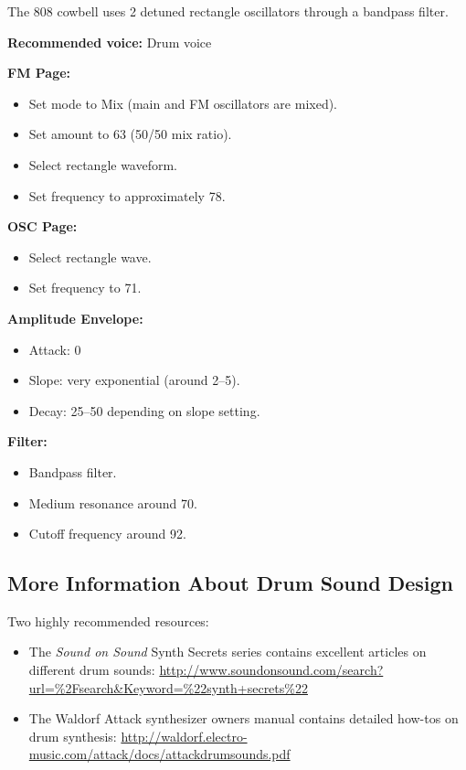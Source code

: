 The 808 cowbell uses 2 detuned rectangle oscillators through a bandpass
filter.

\textbf{Recommended voice:} Drum voice

\textbf{FM Page:}

\begin{itemize}
\tightlist
\item
  Set mode to Mix (main and FM oscillators are mixed).
\item
  Set amount to 63 (50/50 mix ratio).
\item
  Select rectangle waveform.
\item
  Set frequency to approximately 78.
\end{itemize}

\textbf{OSC Page:}

\begin{itemize}
\tightlist
\item
  Select rectangle wave.
\item
  Set frequency to 71.
\end{itemize}

\textbf{Amplitude Envelope:}

\begin{itemize}
\tightlist
\item
  Attack: 0
\item
  Slope: very exponential (around 2--5).
\item
  Decay: 25--50 depending on slope setting.
\end{itemize}

\textbf{Filter:}

\begin{itemize}
\tightlist
\item
  Bandpass filter.
\item
  Medium resonance around 70.
\item
  Cutoff frequency around 92.
\end{itemize}

\subsection{More Information About Drum Sound
Design}\label{more-information-about-drum-sound-design}

Two highly recommended resources:

\begin{itemize}
\item
  The \emph{Sound on Sound} Synth Secrets series contains excellent
  articles on different drum sounds:
  \url{http://www.soundonsound.com/search?url=\%2Fsearch&Keyword=\%22synth+secrets\%22}
\item
  The Waldorf Attack synthesizer owners manual contains detailed how-tos
  on drum synthesis:
  \url{http://waldorf.electro-music.com/attack/docs/attackdrumsounds.pdf}
\end{itemize}

